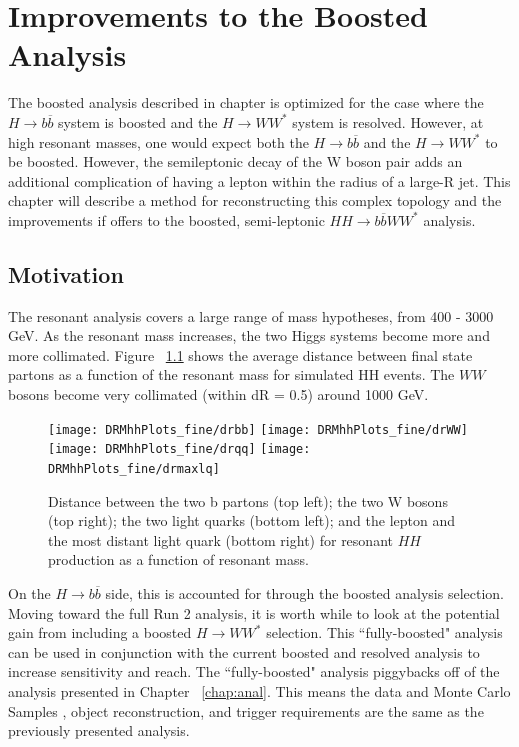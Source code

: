 \chapter{Improvements to the Boosted Analysis}
The boosted analysis described in chapter \cite{chap:anal} is optimized for the case where the ${H\rightarrow b\overline{b}}$ system is boosted and the ${H\rightarrow WW^{*}}$ system is resolved. However, at high resonant masses, one would expect both the ${H\rightarrow b\overline{b}}$ and the ${H\rightarrow WW^{*}}$ to be boosted. However, the semileptonic decay of the W boson pair adds an additional complication of having a lepton within the radius of a large-R jet. This chapter will describe a method for reconstructing this complex topology and the improvements if offers to the boosted, semi-leptonic ${HH\rightarrow b\overline{b}WW^{*}}$ analysis.
\section{Motivation}
The resonant analysis covers a large range of mass hypotheses, from 400 - 3000 GeV. As the resonant mass increases, the two Higgs systems become more and more collimated. Figure ~\ref{fig:dr} shows the average distance between final state partons as a function of the resonant mass for simulated HH events. The $WW$ bosons become very collimated (within dR = 0.5) around 1000 GeV. \newline
\begin{figure}[h]
\begin{center}
\texttt{[image: DRMhhPlots\_fine/drbb]}
\texttt{[image: DRMhhPlots\_fine/drWW]}
\\
\texttt{[image: DRMhhPlots\_fine/drqq]}
\texttt{[image: DRMhhPlots\_fine/drmaxlq]}

\caption{Distance between the two b partons (top left); the two W bosons (top right); the two light quarks (bottom left); and the lepton and the most distant light quark (bottom right) for resonant $HH$ production as a function of resonant mass.}
\label{fig:dr}
\end{center}
\end{figure}
\indent On the ${H\rightarrow b\overline{b}}$ side, this is accounted for through the boosted analysis selection. Moving toward the full Run 2 analysis, it is worth while to look at the potential gain from including a boosted ${H\rightarrow WW^{*}}$ selection. This ``fully-boosted" analysis can be used in conjunction with the current boosted and resolved analysis to increase sensitivity and reach.\newline
\indent The ``fully-boosted" analysis piggybacks off of the analysis presented in Chapter ~\ref{chap:anal}. This means the data and Monte Carlo Samples , object reconstruction, and trigger requirements are the same as the previously presented analysis. \newline
